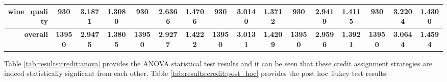 \begin{table}[htbp]
{\begin{tabular}{rccccccccccccccc}
                  wine\_quality                       & 930                                 & 3.1871                                                                    & 1.3080          & 930                                & \cellcolor[rgb]{ .776,  .937,  .808}\textcolor[rgb]{ 0,  .38,  0}{2.6366}          & 1.4706          & 930                                & 3.0140                                                                    & 1.3712          & 930                                & 2.9419                                                                    & 1.4115          & 930                                    & 3.2204                                                                    & 1.4300          \\
                  \midrule
                  \textbf{overall}                    & \textbf{13950}                      & \textbf{2.9475}                                                           & \textbf{1.3805} & \textbf{13950}                     & \cellcolor[rgb]{ .776,  .937,  .808}\textcolor[rgb]{ 0,  .38,  0}{\textbf{2.9277}} & \textbf{1.4222} & \textbf{13950}                     & \textbf{3.0131}                                                           & \textbf{1.4209} & \textbf{13950}                     & \textbf{2.9596}                                                           & \textbf{1.3921} & \textbf{13950}                         & \textbf{3.0644}                                                           & \textbf{1.4594} \\
            \end{tabular}%
      }
\end{table}%

Table \ref{tab:results:credit:anova} provides the ANOVA statistical test results and it can be seen that these credit assignment strategies are indeed statistically signficant from each other. Table \ref{tab:results:credit:post_hoc} provides the post hoc Tukey test results.

